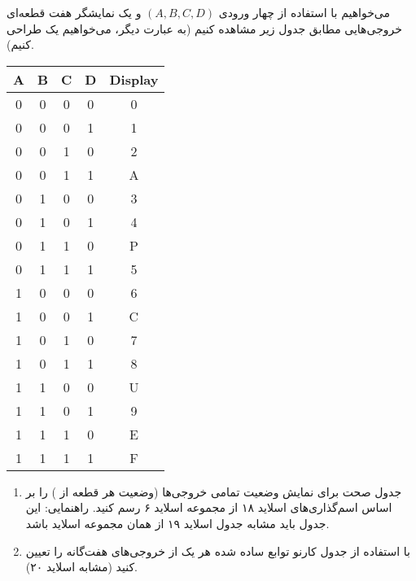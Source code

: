 می‌خواهیم با استفاده از چهار ورودی \((A, B, C, D)\) و یک نمایشگر هفت قطعه‌ای  خروجی‌هایی مطابق جدول زیر مشاهده کنیم (به عبارت دیگر، می‌خواهیم یک  طراحی کنیم).



\begin{latin}
	\begin{center}
		\begin{tabular}{|c|c|c|c|c|}
			\hline
			\textbf{A} & \textbf{B} & \textbf{C} & \textbf{D} & \textbf{Display} \\
			\hline\hline
			0 & 0 & 0 & 0 & 0 \\
			0 & 0 & 0 & 1 & 1 \\
			0 & 0 & 1 & 0 & 2 \\
			0 & 0 & 1 & 1 & A \\
			0 & 1 & 0 & 0 & 3 \\
			0 & 1 & 0 & 1 & 4 \\
			0 & 1 & 1 & 0 & P \\
			0 & 1 & 1 & 1 & 5 \\
			1 & 0 & 0 & 0 & 6 \\
			1 & 0 & 0 & 1 & C \\
			1 & 0 & 1 & 0 & 7 \\
			1 & 0 & 1 & 1 & 8 \\
			1 & 1 & 0 & 0 & U \\
			1 & 1 & 0 & 1 & 9 \\
			1 & 1 & 1 & 0 & E \\
			1 & 1 & 1 & 1 & F \\
			\hline
		\end{tabular}
	\end{center}
\end{latin}


\begin{enumerate}
	\item 
	جدول صحت برای نمایش وضعیت تمامی خروجی‌ها (وضعیت هر قطعه از ) را بر اساس اسم‌گذاری‌های اسلاید ۱۸ از مجموعه اسلاید ۶ رسم کنید. راهنمایی: این جدول باید مشابه جدول اسلاید ۱۹ از همان مجموعه اسلاید باشد.
	
	\item 
	با استفاده از جدول کارنو توابع ساده شده هر یک از خروجی‌های هفت‌گانه را تعیین کنید (مشابه اسلاید ۲۰).
\end{enumerate}




